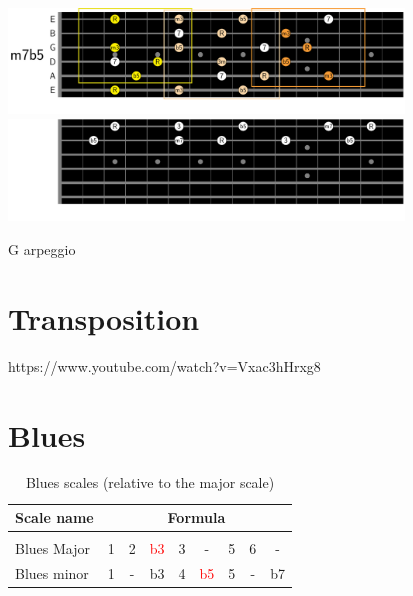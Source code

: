 \documentclass{article}
\begin{document}
\begin{table}[!h]
	\hspace*{-4cm}
	\includegraphics[width=10.5cm, trim= {0cm 0cm 0cm 0cm}, clip]{Arpeges/m7b5_chords.pdf}
	\hspace*{-1cm}
	\includegraphics[width=10.5cm, trim= {0cm 0cm 0cm 0cm}, clip]{Arpeges/2notes_m7b5_chords.pdf}
	\caption{G arpeggio}
	\label{fig}
\end{table}


\newpage
\section{Transposition}

https://www.youtube.com/watch?v=Vxac3hHrxg8


\newpage
\section{Blues}

\begin{table}[!h]
	\caption{Blues scales (relative to the major scale)}
	\centering
	\begin{tabular}{l|cccccccc}
		Scale name  & \multicolumn{8}{c}{Formula} \\ 
		\hline \hline \vspace{-0.4cm} \\
		Blues Major   & 1 & 2  & \textcolor{red}{b3} & 3  &   -   & 5  & 6  &  -  \\ 
		Blues minor   & 1 &  - & b3 & 4  & \textcolor{red}{b5} &  5  & - &  b7 \\ 
	\end{tabular}
	\label{tab: }
\end{table}
\end{document}
